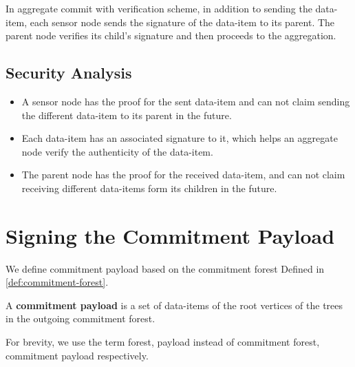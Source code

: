 	In aggregate commit with verification scheme, in addition to sending the data-item, each sensor node sends the signature of the data-item to its parent.
	The parent node verifies its child's signature and then proceeds to the aggregation.
	
	\subsection{Security Analysis}
		\begin{itemize}
			\item A sensor node has the proof for the sent data-item and can not claim sending the different data-item to its parent in the future.
			\item Each data-item has an associated signature to it, which helps an aggregate node verify the authenticity of the data-item.
			\item The parent node has the proof for the received data-item, and can not claim receiving different data-items form its children in the future.
		\end{itemize}

\section{Signing the Commitment Payload}
		We define commitment payload based on the commitment forest Defined in \ref{def:commitment-forest}.
	\begin{definition}
		A \textbf{commitment payload} is a set of data-items of the root vertices of the trees in the outgoing commitment forest.
	\end{definition}
	For brevity, we use the term forest, payload instead of commitment forest, commitment payload respectively.

